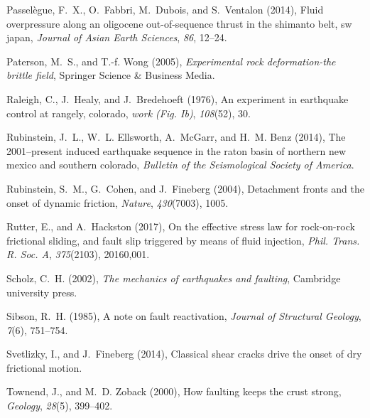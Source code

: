 \documentclass[grl]{agutex2arxiv}
\begin{document}
\begin{article}
\begin{thebibliography}{44}
Passel{\`e}gue, F.~X., O.~Fabbri, M.~Dubois, and S.~Ventalon (2014), Fluid
  overpressure along an oligocene out-of-sequence thrust in the shimanto belt,
  sw japan, \textit{Journal of Asian Earth Sciences}, \textit{86}, 12--24.

Paterson, M.~S., and T.-f. Wong (2005), \textit{Experimental rock
  deformation-the brittle field}, Springer Science \& Business Media.

Raleigh, C., J.~Healy, and J.~Bredehoeft (1976), An experiment in earthquake
  control at rangely, colorado, \textit{work (Fig. Ib)}, \textit{108}(52), 30.

Rubinstein, J.~L., W.~L. Ellsworth, A.~McGarr, and H.~M. Benz (2014), The
  2001--present induced earthquake sequence in the raton basin of northern new
  mexico and southern colorado, \textit{Bulletin of the Seismological Society
  of America}.

Rubinstein, S.~M., G.~Cohen, and J.~Fineberg (2004), Detachment fronts and the
  onset of dynamic friction, \textit{Nature}, \textit{430}(7003), 1005.

Rutter, E., and A.~Hackston (2017), On the effective stress law for
  rock-on-rock frictional sliding, and fault slip triggered by means of fluid
  injection, \textit{Phil. Trans. R. Soc. A}, \textit{375}(2103), 20160,001.

Scholz, C.~H. (2002), \textit{The mechanics of earthquakes and faulting},
  Cambridge university press.

Sibson, R.~H. (1985), A note on fault reactivation, \textit{Journal of
  Structural Geology}, \textit{7}(6), 751--754.

Svetlizky, I., and J.~Fineberg (2014), Classical shear cracks drive the onset
  of dry frictional motion.

Townend, J., and M.~D. Zoback (2000), How faulting keeps the crust strong,
  \textit{Geology}, \textit{28}(5), 399--402.


\end{thebibliography}
\end{article}
\end{document}

